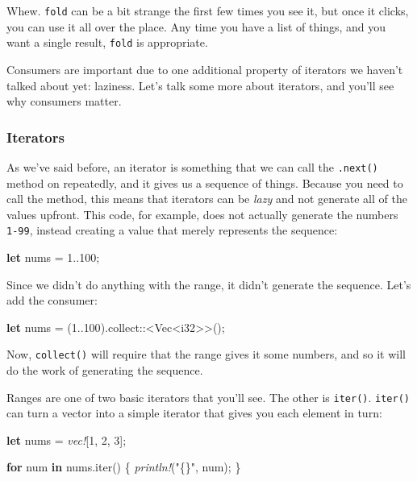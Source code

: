 \documentclass[a4paper,]{book}
\newenvironment{Shaded}{\begin{snugshade}}{\end{snugshade}}
\newcommand{\KeywordTok}[1]{\textcolor[rgb]{0.13,0.29,0.53}{\textbf{{#1}}}}
\newcommand{\DataTypeTok}[1]{\textcolor[rgb]{0.13,0.29,0.53}{{#1}}}
\newcommand{\DecValTok}[1]{\textcolor[rgb]{0.00,0.00,0.81}{{#1}}}
\newcommand{\StringTok}[1]{\textcolor[rgb]{0.31,0.60,0.02}{{#1}}}
\newcommand{\PreprocessorTok}[1]{\textcolor[rgb]{0.56,0.35,0.01}{\textit{{#1}}}}
\newcommand{\NormalTok}[1]{{#1}}
\begin{document}
Whew. \texttt{fold} can be a bit strange the first few times you see it,
but once it clicks, you can use it all over the place. Any time you have
a list of things, and you want a single result, \texttt{fold} is
appropriate.

Consumers are important due to one additional property of iterators we
haven't talked about yet: laziness. Let's talk some more about
iterators, and you'll see why consumers matter.

\hypertarget{iterators}{\subsubsection{Iterators}\label{iterators}}

As we've said before, an iterator is something that we can call the
\texttt{.next()} method on repeatedly, and it gives us a sequence of
things. Because you need to call the method, this means that iterators
can be \emph{lazy} and not generate all of the values upfront. This
code, for example, does not actually generate the numbers \texttt{1-99},
instead creating a value that merely represents the sequence:

\begin{Shaded}
\begin{Highlighting}[]
\KeywordTok{let} \NormalTok{nums = }\DecValTok{1.}\NormalTok{.}\DecValTok{100}\NormalTok{;}
\end{Highlighting}
\end{Shaded}

Since we didn't do anything with the range, it didn't generate the
sequence. Let's add the consumer:

\begin{Shaded}
\begin{Highlighting}[]
\KeywordTok{let} \NormalTok{nums = (}\DecValTok{1.}\NormalTok{.}\DecValTok{100}\NormalTok{).collect::<}\DataTypeTok{Vec}\NormalTok{<}\DataTypeTok{i32}\NormalTok{>>();}
\end{Highlighting}
\end{Shaded}

Now, \texttt{collect()} will require that the range gives it some
numbers, and so it will do the work of generating the sequence.

Ranges are one of two basic iterators that you'll see. The other is
\texttt{iter()}. \texttt{iter()} can turn a vector into a simple
iterator that gives you each element in turn:

\begin{Shaded}
\begin{Highlighting}[]
\KeywordTok{let} \NormalTok{nums = }\PreprocessorTok{vec!}\NormalTok{[}\DecValTok{1}\NormalTok{, }\DecValTok{2}\NormalTok{, }\DecValTok{3}\NormalTok{];}

\KeywordTok{for} \NormalTok{num }\KeywordTok{in} \NormalTok{nums.iter() \{}
   \PreprocessorTok{println!}\NormalTok{(}\StringTok{"\{\}"}\NormalTok{, num);}
\NormalTok{\}}
\end{Highlighting}
\end{Shaded}
\end{document}
